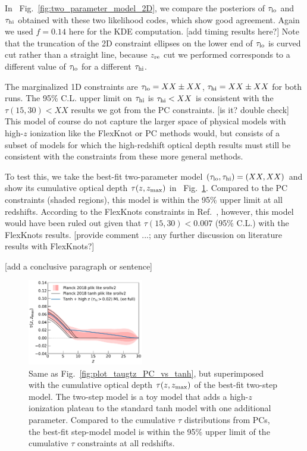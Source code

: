 \documentclass[prd,twocolumn,amsmath,amssymb,floatfix,superscriptaddress,nofootinbib]{revtex4-1}
\newcommand{\reffig}[1]{Fig.~\ref{fig:#1}}
\newcommand{\zmax}{z_{\rm max}}
\newcommand{\zre}{z_{\rm re}}
\newcommand{\tauhi}{\tau_{\rm hi}}
\newcommand{\taulo}{\tau_{\rm lo}}
\begin{document}
In ~\reffig{two_parameter_model_2D}, we compare the posteriors of $\taulo$ and $\tauhi$ obtained with these two likelihood codes, which show good agreement. Again we used $f = 0.14$ here for the KDE computation. [add timing results here?] Note that the truncation of the 2D constraint ellipses on the lower end of $\taulo$ is curved cut rather than a straight line, because $\zre$ cut we performed corresponds to a different value of $\taulo$ for a different $\tauhi$. 

The marginalized 1D constraints are $\taulo = XX \pm XX$, $\tauhi = XX \pm XX$ for both runs. The 95\% C.L. upper limit on $\tauhi$ is $\tauhi < XX$ is consistent with the $\tau(15, 30) < XX$ results we got from the PC constraints. [is it? double check] This model of course do not capture the larger space of physical models with high-$z$ ionization like the FlexKnot or PC methods would, but consists of a subset of models for which the high-redshift optical depth results must still be consistent with the constraints from these more general methods. 

To test this, we take the best-fit two-parameter model $(\taulo, \tauhi) = (XX, XX)$ and show its cumulative optical depth $\tau(z, \zmax)$ in ~\reffig{plot_taugtz_two_step_best_fit}. Compared to the PC constraints (shaded regions), this model is within the 95\% upper limit at all redshifts. According to the FlexKnots constraints in Ref.~\cite{}, however, this model would have been ruled out given that $\tau(15, 30) < 0.007$ (95\% C.L.) with the FlexKnots results. [provide comment ...; any further discussion on literature results with FlexKnots?]

[add a conclusive paragraph or sentence]




\begin{figure}[t]
\includegraphics[width=0.450\textwidth]{plots/plot_tau_gtz.pdf}
\caption{Same as \reffig{plot_taugtz_PC_vs_tanh}, but superimposed with the cumulative optical depth $\tau(z, \zmax)$ of the best-fit two-step model. The two-step model is a toy model that adds a high-$z$ ionization plateau to the standard tanh model with one additional parameter. Compared to the cumulative $\tau$ distributions from PCs, the best-fit step-model model is within the 95\% upper limit of the cumulative $\tau$ constraints at all redshifts. 
}
\label{fig:plot_taugtz_two_step_best_fit}
\end{figure}
\end{document}
